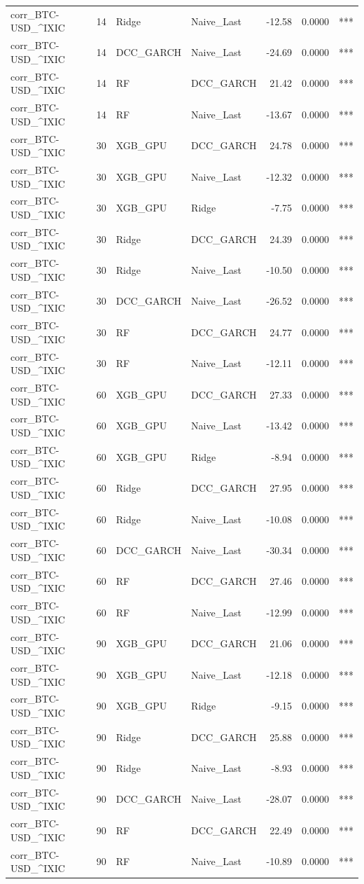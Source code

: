 \begin{table}[H]
\begin{tabular}{llllrrl}
corr_BTC-USD_^IXIC & 14 & Ridge & Naive_Last & -12.58 & 0.0000 & *** \\
corr_BTC-USD_^IXIC & 14 & DCC_GARCH & Naive_Last & -24.69 & 0.0000 & *** \\
corr_BTC-USD_^IXIC & 14 & RF & DCC_GARCH & 21.42 & 0.0000 & *** \\
corr_BTC-USD_^IXIC & 14 & RF & Naive_Last & -13.67 & 0.0000 & *** \\
corr_BTC-USD_^IXIC & 30 & XGB_GPU & DCC_GARCH & 24.78 & 0.0000 & *** \\
corr_BTC-USD_^IXIC & 30 & XGB_GPU & Naive_Last & -12.32 & 0.0000 & *** \\
corr_BTC-USD_^IXIC & 30 & XGB_GPU & Ridge & -7.75 & 0.0000 & *** \\
corr_BTC-USD_^IXIC & 30 & Ridge & DCC_GARCH & 24.39 & 0.0000 & *** \\
corr_BTC-USD_^IXIC & 30 & Ridge & Naive_Last & -10.50 & 0.0000 & *** \\
corr_BTC-USD_^IXIC & 30 & DCC_GARCH & Naive_Last & -26.52 & 0.0000 & *** \\
corr_BTC-USD_^IXIC & 30 & RF & DCC_GARCH & 24.77 & 0.0000 & *** \\
corr_BTC-USD_^IXIC & 30 & RF & Naive_Last & -12.11 & 0.0000 & *** \\
corr_BTC-USD_^IXIC & 60 & XGB_GPU & DCC_GARCH & 27.33 & 0.0000 & *** \\
corr_BTC-USD_^IXIC & 60 & XGB_GPU & Naive_Last & -13.42 & 0.0000 & *** \\
corr_BTC-USD_^IXIC & 60 & XGB_GPU & Ridge & -8.94 & 0.0000 & *** \\
corr_BTC-USD_^IXIC & 60 & Ridge & DCC_GARCH & 27.95 & 0.0000 & *** \\
corr_BTC-USD_^IXIC & 60 & Ridge & Naive_Last & -10.08 & 0.0000 & *** \\
corr_BTC-USD_^IXIC & 60 & DCC_GARCH & Naive_Last & -30.34 & 0.0000 & *** \\
corr_BTC-USD_^IXIC & 60 & RF & DCC_GARCH & 27.46 & 0.0000 & *** \\
corr_BTC-USD_^IXIC & 60 & RF & Naive_Last & -12.99 & 0.0000 & *** \\
corr_BTC-USD_^IXIC & 90 & XGB_GPU & DCC_GARCH & 21.06 & 0.0000 & *** \\
corr_BTC-USD_^IXIC & 90 & XGB_GPU & Naive_Last & -12.18 & 0.0000 & *** \\
corr_BTC-USD_^IXIC & 90 & XGB_GPU & Ridge & -9.15 & 0.0000 & *** \\
corr_BTC-USD_^IXIC & 90 & Ridge & DCC_GARCH & 25.88 & 0.0000 & *** \\
corr_BTC-USD_^IXIC & 90 & Ridge & Naive_Last & -8.93 & 0.0000 & *** \\
corr_BTC-USD_^IXIC & 90 & DCC_GARCH & Naive_Last & -28.07 & 0.0000 & *** \\
corr_BTC-USD_^IXIC & 90 & RF & DCC_GARCH & 22.49 & 0.0000 & *** \\
corr_BTC-USD_^IXIC & 90 & RF & Naive_Last & -10.89 & 0.0000 & *** \\
\bottomrule
\end{tabular}
\end{table}